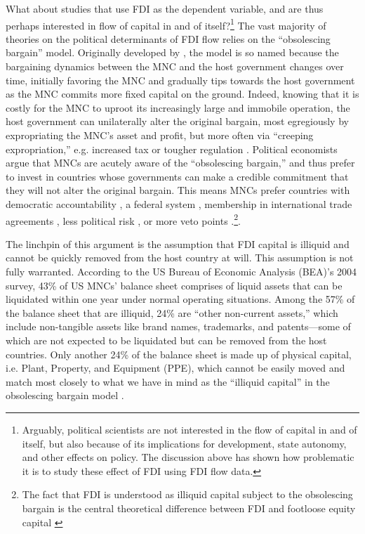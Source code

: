 What about studies that use FDI as the dependent variable, and are thus perhaps
interested in flow of capital in and of itself?\footnote{Arguably, political
scientists are not interested in the flow of capital in and of itself, but also
because of its implications for development, state autonomy, and other effects
on policy. The discussion above has shown how problematic it is to study these
effect of FDI using FDI flow data.} The vast majority of theories on the
political determinants of FDI flow relies on the ``obsolescing bargain'' model.
Originally developed by \citet{Vernon1971}, the model is so named because the
bargaining dynamics between the MNC and the host government changes over time,
initially favoring the MNC and gradually tips towards the host government as the
MNC commits more fixed capital on the ground. Indeed, knowing that it is costly
for the MNC to uproot its increasingly large and immobile operation, the host
government can unilaterally alter the original bargain, most egregiously by
expropriating the MNC's asset and profit, but more often via ``creeping
expropriation,'' e.g. increased tax or tougher regulation \citep{Li2009a}.
Political economists argue that MNCs are acutely aware of the ``obsolescing
bargain,'' and thus prefer to invest in countries whose governments can make a
credible commitment that they will not alter the original bargain. This means
MNCs prefer countries with democratic accountability \citep{Jensen2003}, a
federal system \citep{Jensen2005}, membership in international trade agreements
\citep{Buthe2008}, less political risk \citep{Beazer2011, Graham2010}, or more
veto points \citep{Choi2008}.\footnote{The fact that FDI is understood as
illiquid capital subject to the obsolescing bargain is the central theoretical
difference between FDI and footloose equity capital \citep{Ahlquist2006,
David2008}}.

The linchpin of this argument is the assumption that FDI capital is illiquid and
cannot be quickly removed from the host country at will. This assumption is not
fully warranted. According to the US Bureau of Economic Analysis (BEA)'s 2004
survey, 43\% of US MNCs' balance sheet comprises of liquid assets that can be
liquidated within one year under normal operating situations. Among the 57\% of
the balance sheet that are illiquid, 24\% are ``other non-current assets,''
which include non-tangible assets like brand names, trademarks, and
patents---some of which are not expected to be liquidated but can be removed
from the host countries. Only another 24\% of the balance sheet is made up of
physical capital, i.e. Plant, Property, and Equipment (PPE), which cannot be
easily moved and match most closely to what we have in mind as the ``illiquid
capital'' in the obsolescing bargain model \citep[113]{Kerner2014a}.

